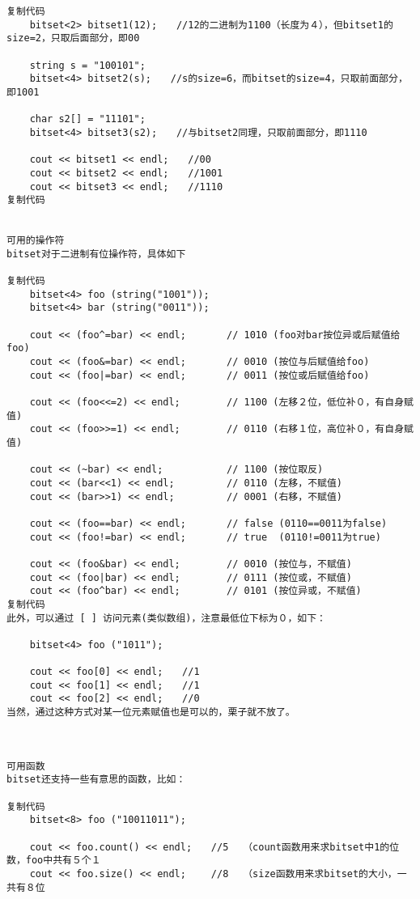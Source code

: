 \documentclass{article}
\begin{document}
\begin{CJK*}{UTF8}{song}
\begin{lstlisting}
复制代码
    bitset<2> bitset1(12);　　//12的二进制为1100（长度为４），但bitset1的size=2，只取后面部分，即00

    string s = "100101";　　
    bitset<4> bitset2(s);　　//s的size=6，而bitset的size=4，只取前面部分，即1001

    char s2[] = "11101";
    bitset<4> bitset3(s2);　　//与bitset2同理，只取前面部分，即1110

    cout << bitset1 << endl;　　//00
    cout << bitset2 << endl;　　//1001
    cout << bitset3 << endl;　　//1110
复制代码


可用的操作符
bitset对于二进制有位操作符，具体如下

复制代码
    bitset<4> foo (string("1001"));
    bitset<4> bar (string("0011"));

    cout << (foo^=bar) << endl;       // 1010 (foo对bar按位异或后赋值给foo)
    cout << (foo&=bar) << endl;       // 0010 (按位与后赋值给foo)
    cout << (foo|=bar) << endl;       // 0011 (按位或后赋值给foo)

    cout << (foo<<=2) << endl;        // 1100 (左移２位，低位补０，有自身赋值)
    cout << (foo>>=1) << endl;        // 0110 (右移１位，高位补０，有自身赋值)

    cout << (~bar) << endl;           // 1100 (按位取反)
    cout << (bar<<1) << endl;         // 0110 (左移，不赋值)
    cout << (bar>>1) << endl;         // 0001 (右移，不赋值)

    cout << (foo==bar) << endl;       // false (0110==0011为false)
    cout << (foo!=bar) << endl;       // true  (0110!=0011为true)

    cout << (foo&bar) << endl;        // 0010 (按位与，不赋值)
    cout << (foo|bar) << endl;        // 0111 (按位或，不赋值)
    cout << (foo^bar) << endl;        // 0101 (按位异或，不赋值)
复制代码
此外，可以通过 [ ] 访问元素(类似数组)，注意最低位下标为０，如下：

    bitset<4> foo ("1011");

    cout << foo[0] << endl;　　//1
    cout << foo[1] << endl;　　//1
    cout << foo[2] << endl;　　//0
当然，通过这种方式对某一位元素赋值也是可以的，栗子就不放了。



可用函数
bitset还支持一些有意思的函数，比如：

复制代码
    bitset<8> foo ("10011011");

    cout << foo.count() << endl;　　//5　　（count函数用来求bitset中1的位数，foo中共有５个１
    cout << foo.size() << endl;　　 //8　　（size函数用来求bitset的大小，一共有８位


\end{lstlisting}
\end{CJK*}
\end{document}
